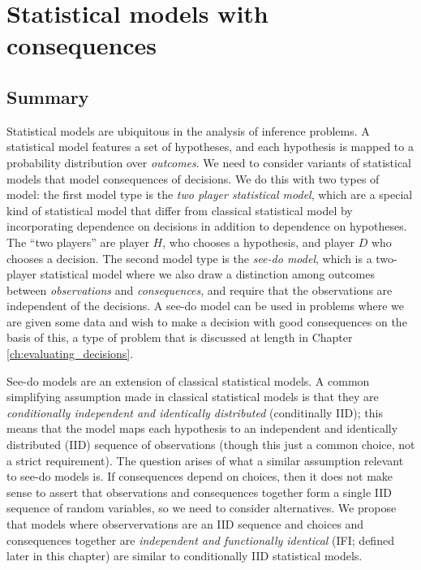 

\chapter{Statistical models with consequences}\label{ch:2p_statmodels}

\section{Summary}

Statistical models are ubiquitous in the analysis of inference problems. A statistical model features a set of hypotheses, and each hypothesis is mapped to a probability distribution over \emph{outcomes}. We need to consider variants of statistical models that model consequences of decisions. We do this with two types of model: the first model type is the \emph{two player statistical model}, which are a special kind of statistical model that differ from classical statistical model by incorporating dependence on decisions in addition to dependence on hypotheses. The ``two players'' are player $H$, who chooses a hypothesis, and player $D$ who chooses a decision. The second model type is the \emph{see-do model}, which is a two-player statistical model where we also draw a distinction among outcomes between \emph{observations} and \emph{consequences}, and require that the observations are independent of the decisions. A see-do model can be used in problems where we are given some data and wish to make a decision with good consequences on the basis of this, a type of problem that is discussed at length in Chapter \ref{ch:evaluating_decisions}.

See-do models are an extension of classical statistical models. A common simplifying assumption made in classical statistical models is that they are \emph{conditionally independent and identically distributed} (conditinally IID); this means that the model maps each hypothesis to an independent and identically distributed (IID) sequence of observations (though this just a common choice, not a strict requirement). The question arises of what a similar assumption relevant to see-do models is. If consequences depend on choices, then it does not make sense to assert that observations and consequences together form a single IID sequence of random variables, so we need to consider alternatives. We propose that models where observervations are an IID sequence and choices and consequences together are \emph{independent and functionally identical} (IFI; defined later in this chapter) are similar to conditionally IID statistical models. 

